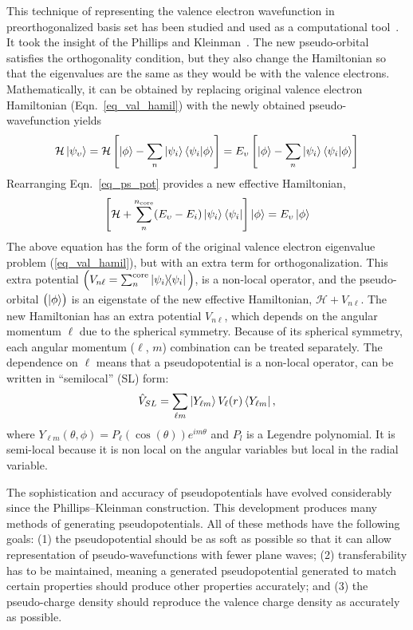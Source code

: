 This technique of representing the valence electron wavefunction in preorthogonalized basis set has been studied and used as a computational tool~\cite{herring1940new}. It took the insight of the Phillips and Kleinman~\cite{phillips1959new}. The new pseudo-orbital satisfies the orthogonality condition, but they also change the Hamiltonian so that the eigenvalues are the same as they would be with the valence electrons. Mathematically, it can be obtained by replacing original valence electron Hamiltonian (Eqn.~\eqref{eq_val_hamil}) with the newly obtained pseudo-wavefunction yields
\begin{equation}
\label{eq_ps_pot}
\mathcal{H}\ket{\psi_{\upsilon}} = \mathcal{H} \left [ \ket{\phi} - \sum_n \ket{\psi_i}\braket{\psi_i}{\phi} \right ] =E_{\upsilon} \left [ \ket{\phi} - \sum_n \ket{\psi_i}\braket{\psi_i}{\phi}  \right ] 
\end{equation}
Rearranging Eqn.~\eqref{eq_ps_pot} provides a new effective Hamiltonian,
\begin{equation}
\label{eq_ps_hamil}
\left [ \mathcal{H} + \sum_n ^{n_{\text{core}}} (E_{\upsilon} - E_i)\ket{\psi_i}\bra{\psi_i}\right ]\ket{\phi} = 
E_{\upsilon}\ket{\phi}
\end{equation}
The above equation has the form of the original valence electron eigenvalue problem (\ref{eq_val_hamil}), but with an extra term for orthogonalization. This extra potential $\Big(V_{n\ell} = \sum_n^{\text{core}} \dyad{\psi_i}{\psi_i}\Big)$, is a non-local operator, and the pseudo-orbital $\bigl(\ket{\phi}\bigr)$ is an eigenstate of the new effective Hamiltonian, $\mathcal{H} + V_{n\ell}$. The new Hamiltonian has an extra potential $V_{n\ell}$, which depends on the angular momentum $\ell$ due to the spherical symmetry. Because of its spherical symmetry, each angular momentum ($\ell$, $m$) combination can be treated separately. The dependence on $\ell$ means that a pseudopotential is a non-local operator, can be written in ``semilocal'' (SL) form:
\begin{equation}
\label{eq_sl}
\hat{V}_{SL} = \sum_{\ell m} \ket{Y_{\ell m}}V_\ell(r)\bra{Y_{\ell m}},
\end{equation}
where $Y_{\ell m}(\theta,\phi) = P_\ell(\cos(\theta))e^{im\theta}$ and $P_l$ is a Legendre polynomial. It is semi-local because it is non local on the angular variables but local in the radial variable.%


The sophistication and accuracy of pseudopotentials have evolved considerably since the Phillips--Kleinman construction. This development produces many methods of generating pseudopotentials. All of these methods have the following goals: (1) the pseudopotential should be as soft as possible so that it can allow representation of pseudo-wavefunctions with fewer plane waves; (2) transferability has to be maintained, meaning a generated pseudopotential generated to match certain properties should produce other properties accurately; and (3) the pseudo-charge density should reproduce the valence charge density as accurately as possible. 


